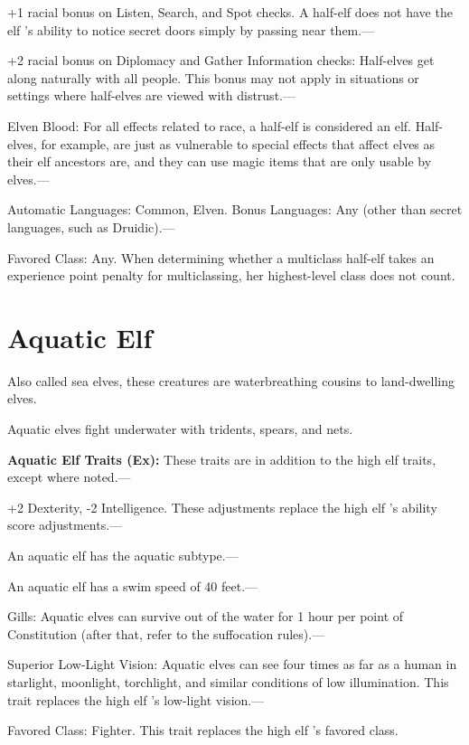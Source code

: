 \documentclass{article}
\begin{document}
\parindent=3pt
+1 racial bonus on Listen, Search, and Spot checks. A half-elf does not have the 
elf 's ability to notice secret doors simply by passing near them.--- 

+2 racial bonus on Diplomacy and Gather Information checks: Half-elves get along 
naturally with all people. This bonus may not apply in situations or settings where 
half-elves are viewed with distrust.---

Elven Blood: For all effects related to race, a half-elf is considered an elf. 
Half-elves, for example, are just as vulnerable to special effects that affect 
elves as their elf ancestors are, and they can use magic items that are only usable 
by elves.---

Automatic Languages: Common, Elven. Bonus Languages: Any (other than secret languages, 
such as Druidic).---

Favored Class: Any. When determining whether a multiclass half-elf takes an experience 
point penalty for multiclassing, her highest-level class does not count.

\vspace{12pt}
\section*{\textbf{Aquatic Elf}}

\parindent=0pt
Also called sea elves, these creatures are waterbreathing cousins to land-dwelling 
elves.

Aquatic elves fight underwater with tridents, spears, and nets.

\textbf{Aquatic Elf Traits (Ex):} These traits are in addition to the high elf 
traits, except where noted.--- 

\parindent=3pt
+2 Dexterity, -2 Intelligence. These adjustments replace the high elf 's ability 
score adjustments.---

\parindent=0pt
An aquatic elf has the aquatic subtype.---

An aquatic elf has a swim speed of 40 feet.---

Gills: Aquatic elves can survive out of the water for 1 hour per point of Constitution 
(after that, refer to the suffocation rules).---

Superior Low-Light Vision: Aquatic elves can see four times as far as a human in 
starlight, moonlight, torchlight, and similar conditions of low illumination. This 
trait replaces the high elf 's low-light vision.---

Favored Class: Fighter. This trait replaces the high elf 's favored class.
\end{document}
